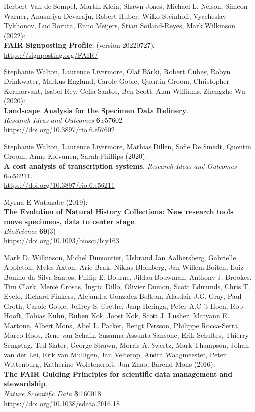 \begin{thebibliography}{9}
Herbert Van de Sompel, Martin Klein, Shawn
Jones, Michael L. Nelson, Simeon Warner, Anusuriya Devaraju, Robert
Huber, Wilko Steinhoff, Vyacheslav Tykhonov, Luc Boruta, Enno Meijers,
Stian Soiland-Reyes, Mark Wilkinson (2022):\\
\textbf{FAIR Signposting Profile}. (version 20220727).\\
\url{https://signposting.org/FAIR/}

Stephanie Walton, Laurence Livermore, Olaf Bánki,
Robert Cubey, Robyn Drinkwater, Markus Englund, Carole Goble, Quentin
Groom, Christopher Kermorvant, Isabel Rey, Celia Santos, Ben Scott, Alan
Williams, Zhengzhe Wu (2020):\\
\textbf{Landscape Analysis for the Specimen Data Refinery}.\\
\emph{Research Ideas and Outcomes} \textbf{6}:e57602\\
\url{https://doi.org/10.3897/rio.6.e57602}

Stephanie Walton, Laurence Livermore, Mathias Dillen, Sofie De Smedt, Quentin Groom, Anne Koivunen, Sarah Phillips (2020):\\
\textbf{A cost analysis of transcription systems}. 
\emph{Research Ideas and Outcomes} \textbf{6}:e56211.\\
\url{https://doi.org/10.3897/rio.6.e56211}

Myrna E Watanabe (2019):\\
\textbf{The Evolution of Natural History Collections:
New research tools move specimens, data to center stage}.\\
\emph{BioScience} \textbf{69}(3)\\
\url{https://doi.org/10.1093/biosci/biy163}

Mark D. Wilkinson, Michel Dumontier, IJsbrand Jan
Aalbersberg, Gabrielle Appleton, Myles Axton, Arie Baak, Niklas
Blomberg, Jan-Willem Boiten, Luiz Bonino da Silva Santos, Philip E.
Bourne, Jildau Bouwman, Anthony J. Brookes, Tim Clark, Mercè Crosas,
Ingrid Dillo, Olivier Dumon, Scott Edmunds, Chris T. Evelo, Richard
Finkers, Alejandra Gonzalez-Beltran, Alasdair J.G. Gray, Paul Groth,
Carole Goble, Jeffrey S. Grethe, Jaap Heringa, Peter A.C 't Hoen, Rob
Hooft, Tobias Kuhn, Ruben Kok, Joost Kok, Scott J. Lusher, Maryann E.
Martone, Albert Mons, Abel L. Packer, Bengt Persson, Philippe
Rocca-Serra, Marco Roos, Rene van Schaik, Susanna-Assunta Sansone, Erik
Schultes, Thierry Sengstag, Ted Slater, George Strawn, Morris A. Swertz,
Mark Thompson, Johan van der Lei, Erik van Mulligen, Jan Velterop, Andra
Waagmeester, Peter Wittenburg, Katherine Wolstencroft, Jun Zhao, Barend
Mons (2016):\\
\textbf{The FAIR Guiding Principles for scientific data management and
stewardship}.\\
\emph{Nature Scientific Data} \textbf{3}:160018\\
\url{https://doi.org/10.1038/sdata.2016.18}



\end{thebibliography}
